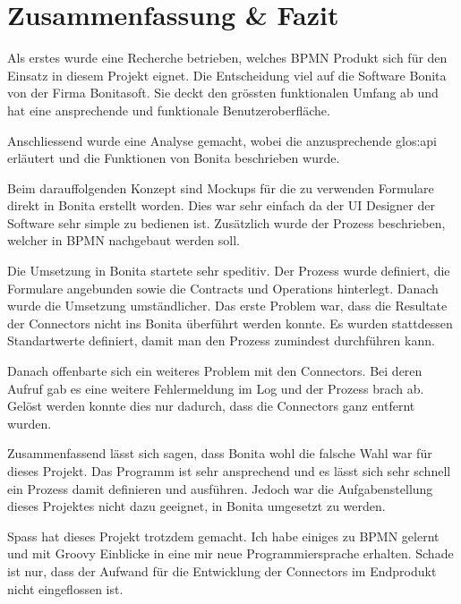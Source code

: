 \chapter{Zusammenfassung \& Fazit}
Als erstes wurde eine Recherche betrieben, welches BPMN Produkt sich für den Einsatz in diesem Projekt eignet. Die Entscheidung viel auf die Software Bonita von der Firma Bonitasoft. Sie deckt den grössten funktionalen Umfang ab und hat eine ansprechende und funktionale Benutzeroberfläche. 

Anschliessend wurde eine Analyse gemacht, wobei die anzusprechende \Gls{glos:api} erläutert und die Funktionen von Bonita beschrieben wurde.

Beim darauffolgenden Konzept sind Mockups für die zu verwenden Formulare direkt in Bonita erstellt worden. Dies war sehr einfach da der UI Designer der Software sehr simple zu bedienen ist. Zusätzlich wurde der Prozess beschrieben, welcher in BPMN nachgebaut werden soll.

Die Umsetzung in Bonita startete sehr speditiv. Der Prozess wurde definiert, die Formulare angebunden sowie die Contracts und Operations hinterlegt. Danach wurde die Umsetzung umständlicher. Das erste Problem war, dass die Resultate der Connectors nicht ins Bonita überführt werden konnte. Es wurden stattdessen Standartwerte definiert, damit man den Prozess zumindest durchführen kann.

Danach offenbarte sich ein weiteres Problem mit den Connectors. Bei deren Aufruf gab es eine weitere Fehlermeldung im Log und der Prozess brach ab. Gelöst werden konnte dies nur dadurch, dass die Connectors ganz entfernt wurden.

Zusammenfassend lässt sich sagen, dass Bonita wohl die falsche Wahl war für dieses Projekt. Das Programm ist sehr ansprechend und es lässt sich sehr schnell ein Prozess damit definieren und ausführen. Jedoch war die Aufgabenstellung dieses Projektes nicht dazu geeignet, in Bonita umgesetzt zu werden.

Spass hat dieses Projekt trotzdem gemacht. Ich habe einiges zu BPMN gelernt und mit Groovy Einblicke in eine mir neue Programmiersprache erhalten. Schade ist nur, dass der Aufwand für die Entwicklung der Connectors im Endprodukt nicht eingeflossen ist.